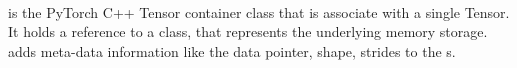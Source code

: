 \begin{defnbox}\nospacing
    \begin{defn}\label{defn:c10::TensorImpl}\leavevmode\\
         is the PyTorch C++ Tensor container class that is associate with a single Tensor.
        It holds a reference to a  class, that represents the underlying memory storage.\\
         adds meta-data information like the data pointer, shape, strides to the s.
    \end{defn}
\end{defnbox}
